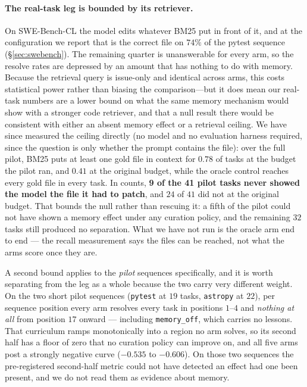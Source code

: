 \paragraph{The real-task leg is bounded by its retriever.}
On SWE-Bench-CL the model edits whatever BM25 put in front of it, and at
the configuration we report that is the correct file on $74\%$ of the
pytest sequence (\S\ref{sec:swebench}). The remaining quarter is
unanswerable for every arm, so the resolve rates are depressed by an
amount that has nothing to do with memory. Because the retrieval query
is issue-only and identical across arms, this costs statistical power
rather than biasing the comparison---but it does mean our real-task
numbers are a lower bound on what the same memory mechanism would show
with a stronger code retriever, and that a null result there would be
consistent with either an absent memory effect or a retrieval ceiling.
We have since measured the ceiling directly (no model and no evaluation
harness required, since the question is only whether the prompt contains
the file): over the full pilot, BM25 puts at least one gold file in
context for $0.78$ of tasks at the budget the pilot ran, and $0.41$ at
the original budget, while the oracle control reaches every gold file in
every task. In counts, \textbf{9 of the 41 pilot tasks never showed the
model the file it had to patch}, and $24$ of $41$ did not at the original
budget. That bounds the null rather than rescuing it: a fifth of the
pilot could not have shown a memory effect under any curation policy, and
the remaining $32$ tasks still produced no separation. What we have not
run is the oracle arm end to end --- the recall measurement says the
files can be reached, not what the arms score once they are.

A second bound applies to the \emph{pilot} sequences specifically, and
it is worth separating from the leg as a whole because the two carry
very different weight. On the two short pilot sequences (\texttt{pytest}
at $19$ tasks, \texttt{astropy} at $22$), per sequence position every
arm resolves every task in positions $1$--$4$ and \emph{nothing at all}
from position $17$ onward --- including \texttt{memory\_off}, which
carries no lessons. That curriculum ramps monotonically into a region no
arm solves, so its second half has a floor of zero that no curation
policy can improve on, and all five arms post a strongly negative curve
($-0.535$ to $-0.606$). On those two sequences the pre-registered
second-half metric could not have detected an effect had one been
present, and we do not read them as evidence about memory.

